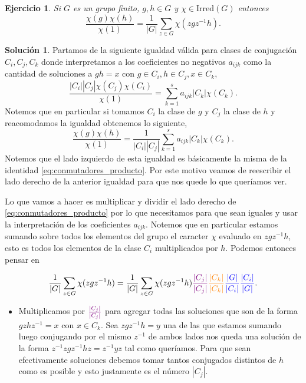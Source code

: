\documentclass[11pt]{article}
\theoremstyle{plain}
\newtheorem*{ej}{Ejercicio}
\theoremstyle{definition}
\newtheorem*{sol}{Solución}
\theoremstyle{remark}
\begin{document}
	

\begin{tcolorbox}[colback=teal!25!white,colframe=teal!75!black]
	\begin{ej}
		Si $G$ es un grupo finito, $g,h \in G$ y $\chi \in \text{Irred}(G)$ entonces
		\begin{equation}
		\label{eq:conmutadores_producto}
		\dfrac{\chi(g) \chi(h)}{\chi (1)} = \dfrac{1}{|G|} \sum_{z \in G} \chi(zgz^{-1}h).
		\end{equation}
		 
	\end{ej}	
\end{tcolorbox}
\medskip

\begin{sol}
	Partamos de la siguiente igualdad válida para clases de conjugación $C_i, C_j, C_k$ donde interpretamos a los coeficientes no negativos $a_{ijk}$ como la cantidad de soluciones a $gh=x$ con $g \in C_i, h \in C_j, x \in C_k$,
	\[ 
	\dfrac{|C_i||C_j|\chi(C_j)\chi(C_i)}{\chi(1)} = \sum_{k=1}^s a_{ijk} |C_k| \chi(C_k).
	\]
	Notemos que en particular si tomamos $C_i$ la clase de $g$ y $C_j$ la clase de $h$ y reacomodamos la igualdad obtenemos lo siguiente,
	\[ 
	\dfrac{\chi(g)\chi(h)}{\chi(1)} = \dfrac{1}{|C_i||C_j|} \sum_{k=1}^s a_{ijk} |C_k| \chi(C_k).
	\]
	Notemos que el lado izquierdo de esta igualdad es básicamente la misma de la identidad \ref{eq:conmutadores_producto}. Por este motivo veamos de reescribir el lado derecho de la anterior igualdad para que nos quede lo que queríamos ver. 
	
	Lo que vamos a hacer es multiplicar y dividir el lado derecho de \ref{eq:conmutadores_producto} por lo que necesitamos para que sean iguales y usar la interpretación de los coeficientes $a_{ijk}$. Notemos que en particular estamos sumando sobre todos los elementos del grupo el caracter $\chi$ evaluado en $zgz^{-1}h$, esto es todos los elementos de la clase $C_i$ multiplicados por $h$. Podemos entonces pensar en 
		
	\begin{equation*}
	\dfrac{1}{|G|} \sum_{z \in G} \chi(zgz^{-1}h) = \dfrac{1}{|G|} \sum_{z \in G} \chi(zgz^{-1}h)   \textcolor{violet}{ \dfrac{|C_j|}{|C_j|}}  \textcolor{orange}{\dfrac{|C_k|}{|C_k|}}   \textcolor{blue}{\dfrac{|G|}{|C_i|} \dfrac{|C_i|}{|G|}}.
	\end{equation*}

    \begin{itemize}
	\item Multiplicamos por $\textcolor{violet}{ \frac{|C_j|}{|C_j|}}$ para agregar todas las soluciones que son de la forma $gzhz^{-1} = x$ con $x \in C_k$. Sea $zgz^{-1}h = y$ una de las que estamos sumando luego conjugando por el mismo $z^{-1}$ de ambos lados nos queda una solución de la forma $z^{-1}zgz^{-1}hz = z^{-1}yz$ tal como queríamos. Para que sean efectivamente soluciones debemos tomar tantos conjugados distintos de $h$ como es posible y esto justamente es el número $|C_j|$.
	

\end{itemize}
\end{sol}
\end{document}
